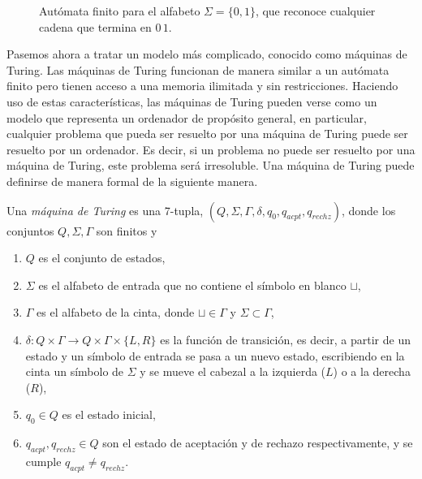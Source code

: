 \begin{figure}[b]
    \centering
    \caption{Autómata finito para el alfabeto $\Sigma = \{0,1\}$, que reconoce cualquier cadena que termina en $0\,1$.}
    \label{fig:automata-finito}
\end{figure}

Pasemos ahora a tratar un modelo más complicado, conocido como máquinas de Turing. Las máquinas de Turing funcionan de manera similar a un autómata finito pero tienen acceso a una memoria ilimitada y sin restricciones. Haciendo uso de estas características, las máquinas de Turing pueden verse como un modelo que representa un ordenador de propósito general, en particular, cualquier problema que pueda ser resuelto por una máquina de Turing puede ser resuelto por un ordenador. Es decir, si un problema no puede ser resuelto por una máquina de Turing, este problema será irresoluble. Una máquina de Turing puede definirse de manera formal de la siguiente manera.

\begin{definition}
    Una \textit{máquina de Turing} es una 7-tupla, $(Q,\Sigma,\Gamma,\delta,q_0,q_{acpt},q_{rechz})$, donde los conjuntos $Q,\Sigma,\Gamma$ son finitos y
    \begin{enumerate}
        \item $Q$ es el conjunto de estados,
        \item $\Sigma$ es el alfabeto de entrada que no contiene el símbolo en blanco $\sqcup$,
        \item $\Gamma$ es el alfabeto de la cinta, donde $\sqcup\in\Gamma$ y $\Sigma\subset \Gamma$,
        \item $\delta:Q\times \Gamma\rightarrow Q \times\Gamma\times\{L,R\}$ es la función de transición, es decir, a partir de un estado y un símbolo de entrada se pasa a un nuevo estado, escribiendo en la cinta un símbolo de $\Sigma$ y se mueve el cabezal a la izquierda ($L$) o a la derecha ($R$),
        \item $q_0\in Q$ es el estado inicial,
        \item $q_{acpt},q_{rechz}\in Q$ son el estado de aceptación y de rechazo respectivamente, y se cumple $q_{acpt}\neq q_{rechz}$.
    \end{enumerate}
\end{definition}

